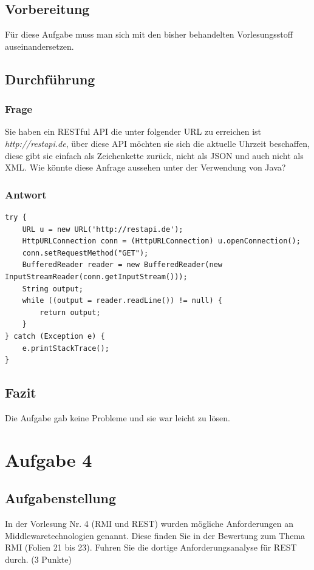 \subsection{Vorbereitung}
Für diese Aufgabe muss man sich mit den bisher behandelten Vorlesungsstoff auseinandersetzen.

\subsection{Durchführung}

\subsubsection{Frage}
Sie haben ein RESTful API die unter folgender URL zu erreichen ist \textit{http://restapi.de}, über diese API möchten sie sich die aktuelle Uhrzeit beschaffen, diese gibt sie einfach als Zeichenkette zurück, nicht als JSON und auch nicht als XML. Wie könnte diese Anfrage aussehen unter der Verwendung von Java?

\subsubsection{Antwort}
\begin{lstlisting}
try {
	URL u = new URL('http://restapi.de');
	HttpURLConnection conn = (HttpURLConnection) u.openConnection();
	conn.setRequestMethod("GET");
	BufferedReader reader = new BufferedReader(new InputStreamReader(conn.getInputStream()));
	String output;
	while ((output = reader.readLine()) != null) {
		return output;
	}
} catch (Exception e) {
	e.printStackTrace();
}
\end{lstlisting}

\subsection{Fazit}
Die Aufgabe gab keine Probleme und sie war leicht zu lösen.

\section{Aufgabe 4}

\subsection{Aufgabenstellung}
In der Vorlesung Nr. 4 (RMI und REST) wurden mögliche Anforderungen an Middlewaretechnologien
genannt. Diese finden Sie in der Bewertung zum Thema RMI (Folien 21
bis 23). Fuhren Sie die dortige Anforderungsanalyse für REST durch. (3 Punkte)

